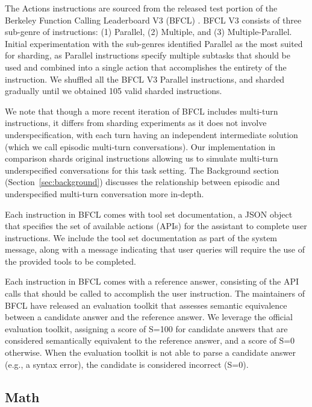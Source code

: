 \documentclass{article}
\begin{document}
\begin{appendices}
The Actions instructions are sourced from the released test portion of the Berkeley Function Calling Leaderboard V3 (BFCL) \cite{2024bfcl}. BFCL V3 consists of three sub-genre of instructions: (1) Parallel, (2) Multiple, and (3) Multiple-Parallel. Initial experimentation with the sub-genres identified Parallel as the most suited for sharding, as Parallel instructions specify multiple subtasks that should be used and combined into a single action that accomplishes the entirety of the instruction. We shuffled all the BFCL V3 Parallel instructions, and sharded gradually until we obtained 105 valid sharded instructions.

We note that though a more recent iteration of BFCL includes multi-turn instructions, it differs from sharding experiments as it does not involve underspecification, with each turn having an independent intermediate solution (which we call episodic multi-turn conversations). Our implementation in comparison shards original instructions allowing us to simulate multi-turn underspecified conversations for this task setting. The Background section (Section~\ref{sec:background}) discusses the relationship between episodic and underspecified multi-turn conversation more in-depth.

Each instruction in BFCL comes with tool set documentation, a JSON object that specifies the set of available actions (APIs) for the assistant to complete user instructions. We include the tool set documentation as part of the system message, along with a message indicating that user queries will require the use of the provided tools to be completed.

Each instruction in BFCL comes with a reference answer, consisting of the API calls that should be called to accomplish the user instruction. The maintainers of BFCL have released an evaluation toolkit that assesses semantic equivalence between a candidate answer and the reference answer. We leverage the official evaluation toolkit, assigning a score of S=100 for candidate answers that are considered semantically equivalent to the reference answer, and a score of S=0 otherwise. When the evaluation toolkit is not able to parse a candidate answer (e.g., a syntax error), the candidate is considered incorrect (S=0).

\subsection{\texorpdfstring{\tmath Math}{Math}}


\end{appendices}
\end{document}

